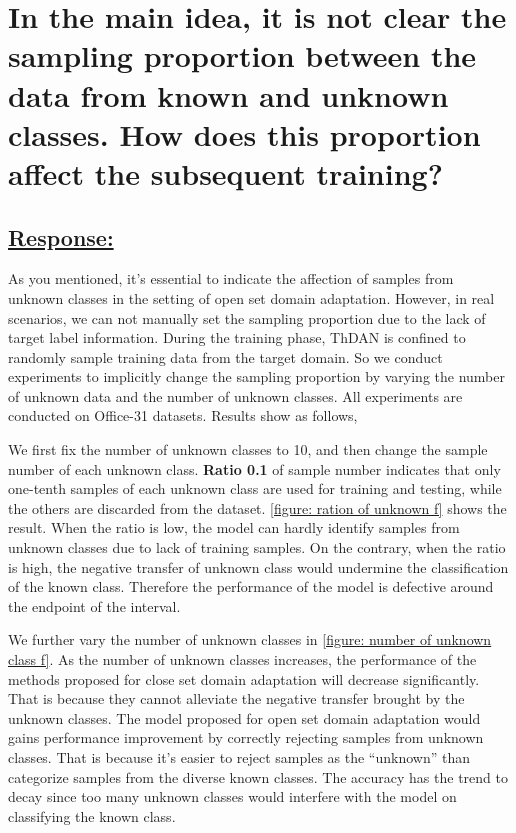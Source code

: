 \section*{In the main idea, it is not clear the sampling proportion between the data from known and unknown classes. How does this proportion affect the subsequent training?}

\subsection*{\underline{\textbf{Response:}}}

As you mentioned, it’s essential to indicate the affection of samples from unknown classes in the setting of open set domain adaptation. 
However, in real scenarios, we can not manually set the sampling proportion due to the lack of target label information.
During the training phase, ThDAN is confined to randomly sample training data from the target domain.
So we conduct experiments to implicitly change the sampling proportion by varying the number of unknown data and the number of unknown classes.
All experiments are conducted on Office-31 datasets.
Results show as follows,



We first fix the number of unknown classes to 10, and then change the sample number of each unknown class.
\textbf{Ratio 0.1} of sample number indicates that only one-tenth samples of each unknown class are used for training and testing, while the others are discarded from the dataset.
\figurename{\ref{figure: ration of unknown f}} shows the result.
When the ratio is low, the model can hardly identify samples from unknown classes due to lack of training samples. 
On the contrary, when the ratio is high, the negative transfer of unknown class would undermine the classification of the known class. 
Therefore the performance of the model is defective around the endpoint of the interval. 

We further vary the number of unknown classes in \figurename{\ref{figure: number of unknown class f}}. 
As the number of unknown classes increases, the performance of the methods proposed for close set domain adaptation will decrease significantly. 
That is because they cannot alleviate the negative transfer brought by the unknown classes.
The model proposed for open set domain adaptation would gains performance improvement by correctly rejecting samples from unknown classes. 
That is because it's easier to reject samples as the ``unknown'' than categorize samples from the diverse known classes.  
The accuracy has the trend to decay since too many unknown classes would interfere with the model on classifying the known class.

